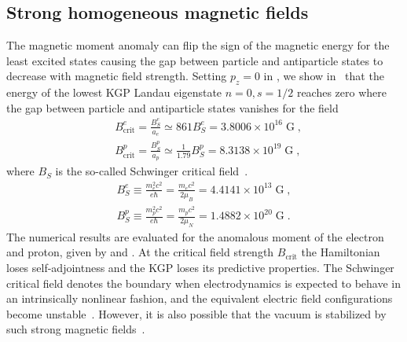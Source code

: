 \subsection{Strong homogeneous magnetic fields}
\label{sec:sbl}
\noindent The magnetic moment anomaly can flip the sign of the magnetic energy for the least excited states causing the gap between particle and antiparticle states to decrease with magnetic field strength. Setting $p_z=0$ in , we show in~ that the energy of the lowest KGP Landau eigenstate $n=0, s=1/2$ reaches zero where the gap between particle and antiparticle states vanishes for the field
\begin{subequations}
\begin{alignat}{1}\label{Bcrit}
&B_\mathrm{crit}^{e}=\frac{{B}_{S}^{e}}{a_{e}}\simeq861{B}_{S}^{e} =3.8006\times10^{16}\;\mathrm{G}\;,\\
&B_\mathrm{crit}^{p}=\frac{{B}_{S}^{p}}{a_{p}}\simeq\frac{1}{1.79}{B}_{S}^{p}=8.3138\times10^{19}\;\mathrm{G}\;,
\end{alignat} 
\end{subequations}
where ${B}_{S}$ is the so-called Schwinger critical field~\citep{Schwinger:1951nm}.
\begin{subequations}
\begin{alignat}{1}\label{Bsch}
{B}_{S}^{e}\equiv\frac{{m_{e}^2}c^2}{e\hbar}=\frac{m_{e}c^2}{2\mu_B}=4.4141\times 10^{13}\;\mathrm{G}\;,\\
{B}_{S}^{p}\equiv\frac{{m_{p}^2}c^2}{e\hbar}=\frac{m_{p}c^2}{2\mu_N}=1.4882\times 10^{20}\;\mathrm{G}\;.
\end{alignat}
\end{subequations}
The numerical results are evaluated for the anomalous moment of the electron and proton, given by  and . At the critical field strength $B_\mathrm{crit}$ the Hamiltonian loses self-adjointness and the KGP loses its predictive properties. The Schwinger critical field  denotes the boundary when electrodynamics is expected to behave in an intrinsically nonlinear fashion, and the equivalent electric field configurations become unstable~\citep{Labun:2008re}. However, it is also possible that the vacuum is stabilized by such strong magnetic fields~\citep{Evans:2018kor}.
 
